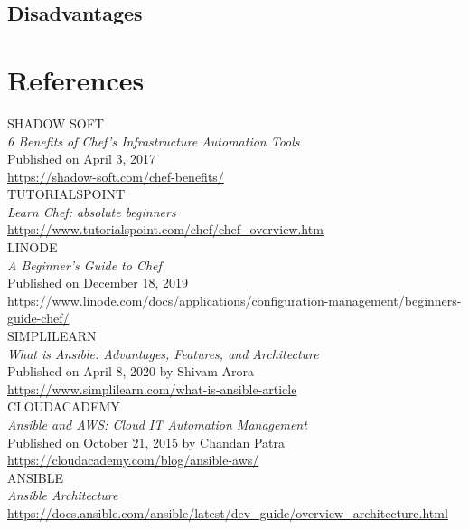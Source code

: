 \documentclass[a4paper, 12pt]{article}
\begin{document}
\subsection{Disadvantages}

\newpage
\section{References}
SHADOW SOFT\\
\textit{6 Benefits of Chef's Infrastructure Automation Tools}\\
Published on April 3, 2017\\
\href{https://shadow-soft.com/chef-benefits/}{https://shadow-soft.com/chef-benefits/}\\

\noindent
TUTORIALSPOINT\\
\textit{Learn Chef: absolute beginners}\\
\href{https://www.tutorialspoint.com/chef/chef_overview.htm}{https://www.tutorialspoint.com/chef/chef\_overview.htm}\\

\noindent
LINODE\\
\textit{A Beginner's Guide to Chef}\\
Published on December 18, 2019\\
\href{https://www.linode.com/docs/applications/configuration-management/beginners-guide-chef/}{https://www.linode.com/docs/applications/configuration-management/beginners-guide-chef/}\\

\noindent
SIMPLILEARN\\
\textit{What is Ansible: Advantages, Features, and Architecture}\\
Published on April 8, 2020 by Shivam Arora\\
\href{https://www.simplilearn.com/what-is-ansible-article}{https://www.simplilearn.com/what-is-ansible-article}\\

\noindent
CLOUDACADEMY\\
\textit{Ansible and AWS: Cloud IT Automation Management}\\
Published on October 21, 2015 by Chandan Patra\\
\href{https://cloudacademy.com/blog/ansible-aws/}{https://cloudacademy.com/blog/ansible-aws/}\\

\noindent
ANSIBLE\\
\textit{Ansible Architecture}\\
\href{https://docs.ansible.com/ansible/latest/dev_guide/overview_architecture.html}{https://docs.ansible.com/ansible/latest/dev\_guide/overview\_architecture.html}\\
\end{document}
